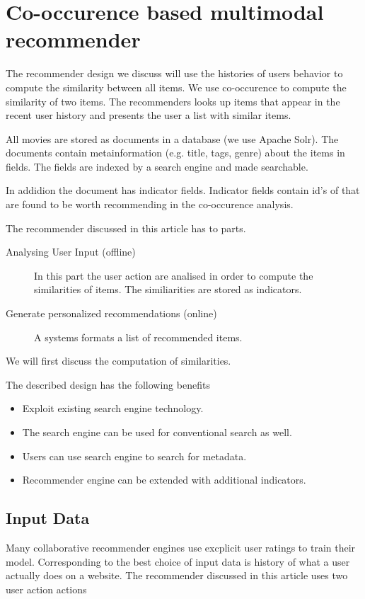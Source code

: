 \section{Co-occurence based multimodal recommender}
\label{sec:design}

The recommender design we discuss will use the histories of users behavior to compute the similarity between all items. We use co-occurence to compute the similarity of two items. The recommenders looks up items that appear in the recent user history and presents the user a list with similar items.

All movies are stored as documents in a database (we use Apache Solr). The documents contain metainformation (e.g. title, tags, genre) about the items in fields. The fields are indexed by a search engine and made searchable.

In addidion the document has indicator fields. Indicator fields contain id's of that are found to be worth recommending in the co-occurence analysis.

The recommender discussed in this article has to parts.
\begin{description}
\item[Analysing User Input (offline)] In this part the user action are analised in order to compute the similarities of items. The similiarities are stored as indicators.
\item[Generate personalized recommendations (online)] A systems formats a list of recommended items.
\end{description}
We will first discuss the computation of similarities.


The described design has the following benefits
\begin{itemize}
\item Exploit existing search engine technology.
\item The search engine can be used for conventional search as well.
\item Users can use search engine to search for metadata.
\item Recommender engine can be extended with additional indicators.
\end{itemize}

\subsection{Input Data}
\label{sec:inputdata}

Many collaborative recommender engines use excplicit user ratings to train their model. Corresponding to \cite{Dunning14} the best choice of input data is history of what a user actually does on a website. The recommender discussed in this article uses two user action actions

